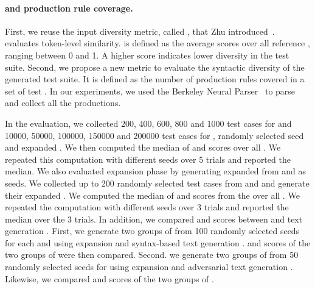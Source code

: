 \paragraph*{\selfbleu and production rule coverage.} First, we reuse the input diversity metric, 
called \selfbleu, that Zhu \etal introduced~\cite{zhu2018texygen}. \bleu~\cite{papineni2002bleu} evaluates token-level similarity.
\selfbleu is defined as the average \bleu scores over all reference \sents, ranging between 0 and 1.
A higher \selfbleu score indicates lower diversity in the test suite.
Second, we propose a new metric to 
evaluate the syntactic diversity of the generated test suite.
It is defined as the number of production rules covered in a set of 
test \sents. In our experiments, we used the Berkeley Neural 
Parser~\cite{kitaev2018seedparser,kitaev2019seedparser} to parse and
collect all the productions.

In the evaluation, we collected 200, 400, 600, 800 and 1000 test cases for \sa and 10000, 50000, 100000, 150000 and 200000 test cases for \hsd, randomly selected \tool seed and expanded \sents. We then computed the median of \selfbleu and \pdr scores over all \lcs. We repeated this computation with different \tool seeds over 5 trials and reported the median. 
We also evaluated \tool expansion phase by generating expanded \sents from \Cklst and 
\hck as seeds. We collected up to 200 randomly selected test cases from \Cklst and 
\hck and generate their expanded \sents. We computed the median of \selfbleu and \pdr 
scores from the \sents over all \lcs. We repeated the computation with different \tool
seeds over 3 trials and reported the median over the 3 trials.
In addition, we compared \selfbleu and \pdr scores between \tool and text generation 
\bls. First, we generate two groups of \sents from 100 randomly selected \tool seeds 
for each \sa and \hsd using \tool expansion and syntax-based text generation \bl. 
\selfbleu and \pdr scores of the two groups of \sents were then compared. Second. we 
generate two groups of \sents from 50 randomly selected \tool seeds for \sa using 
\tool expansion and adversarial text generation \bls. Likewise, we compared \selfbleu 
and \pdr scores of the two groups of \sents.




